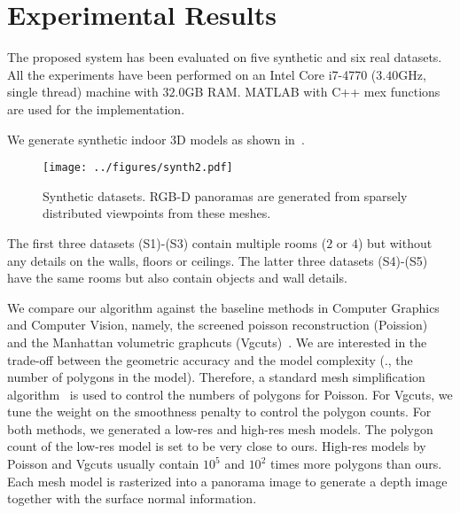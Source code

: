 \section{Experimental Results}
The proposed system has been evaluated on five synthetic and six real
datasets. All the experiments have been performed on an Intel Core
i7-4770 ($3.40$GHz, single thread) machine with $32.0$GB RAM. MATLAB
with C++ mex functions are used for the implementation.

 We generate synthetic indoor 3D models
as shown in~.
%
\begin{figure}[!t]
\begin{center}
\texttt{[image: ../figures/synth2.pdf]}
\end{center}
 \vspace{-0.3cm}
\caption{Synthetic datasets. RGB-D panoramas are generated from sparsely
distributed viewpoints from these meshes.}  \label{fig:synth}
 \vspace{-0.2cm}
\end{figure}
%
The first three datasets (S1)-(S3) contain multiple rooms ($2$ or $4$)
but without any details on the walls, floors or ceilings. The latter
three datasets (S4)-(S5) have the same rooms but also contain objects
and wall details.

We compare our algorithm against the baseline methods in Computer
Graphics and Computer Vision, namely, the screened poisson
reconstruction (Poission)~\cite{Kazhdan2013} and the Manhattan
volumetric graphcuts (Vgcuts)~\cite{furukawa-iccv-2009}. We are
interested in the trade-off between the geometric accuracy and the model
complexity (\eg., the number of polygons in the model). Therefore, a
standard mesh simplification algorithm~\cite{Tarini2010} is used to
control the numbers of polygons for Poisson. For Vgcuts, we tune the
weight on the smoothness penalty to control the polygon counts. For both
methods, we generated a low-res and high-res mesh models. The polygon
count of the low-res model is set to be very close to ours. High-res
models by Poisson and Vgcuts usually contain $10^5$ and $10^2$ times
more polygons than ours.
%
Each mesh
model is rasterized into a panorama image to generate a depth image
together with the surface normal information.

